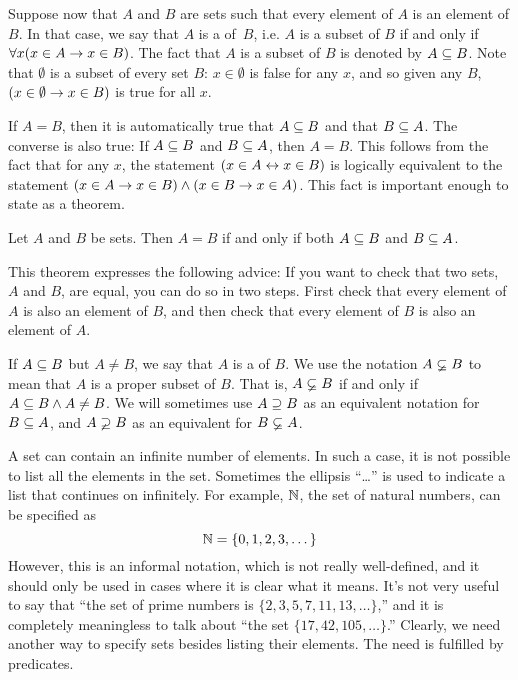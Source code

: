 Suppose now that $A$ and $B$ are sets such that every element of $A$ is
an element of $B$.  
In that case, we say that $A$ is a  of~$B$, i.e. $A$ is a subset
of $B$ if and only if  $\forall x(x\in A \rightarrow x\in B)$. The fact that 
$A$ is a subset of $B$ is denoted by $A\subseteq B$.  Note that $\emptyset$ is a
subset of every set $B$: $x \in \emptyset$ is false for any $x$, and so given
any $B$, $(x\in \emptyset \rightarrow x\in B)$ is true for all $x$.

If $A=B$, then it is automatically true that $A\subseteq B$ and that
$B\subseteq A$.  The converse is also true: If $A\subseteq B$ and $B\subseteq A$,
then $A=B$.  This follows from the fact that for any $x$, the statement 
$(x\in A \leftrightarrow x\in B)$ is logically equivalent to the statement $(x\in A\rightarrow x\in B)
\wedge (x\in B\rightarrow x\in A)$.  This fact is important enough to state as a
theorem.

\begin{theorem}\label{T-setequality}
Let $A$ and $B$ be sets.  Then $A=B$ if and only if both $A\subseteq B$ and $B\subseteq A$.
\end{theorem}

This theorem expresses the following advice:  If you want to check that two
sets, $A$ and $B$, are equal, you can do so in two steps.  First check that
every element of $A$ is also an element of $B$, and then check that every 
element of $B$ is also an element of $A$.

If $A\subseteq B$ but $A\not= B$, we say that $A$ is a  of $B$.
We use the notation $A\varsubsetneq B$ to mean that $A$ is a proper subset of $B$.
That is, $A\varsubsetneq B$ if and only if $A\subseteq B \wedge A\not= B$.  We will sometimes
use $A\supseteq B$ as an equivalent notation for $B\subseteq A$, and $A\varsupsetneq B$ as
an equivalent for $B\varsubsetneq A$.

 
\medbreak

A set can contain an infinite number of elements.  In such a case, it
is not possible to list all the elements in the set.  Sometimes the
ellipsis ``\dots'' is used to indicate a list that continues on infinitely.
For example, ${\mathbb N}$, the set of natural numbers, can be specified as
\[{\mathbb N} = \{ 0, 1, 2, 3, \dots \}\]
However, this is an informal notation, which is not really well-defined,
and it should only be used in cases where it is clear what it means.
It's not very useful to say that ``the set of prime numbers is
$\{2,3,5,7,11,13,\dots\}$,'' and it is completely meaningless to talk
about ``the set $\{17,42,105,\dots\}$.''  Clearly, we need another way to
specify sets besides listing their elements.  The need is fulfilled
by predicates.

